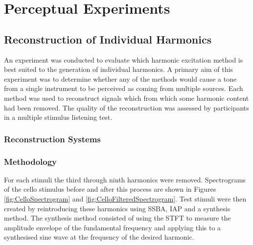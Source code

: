 \chapter{Perceptual Experiments}
\label{chap:PerceptualExperiments}

\section{Reconstruction of Individual Harmonics}
\label{sec:PerceptualExperiments-Reconstruction}
	An experiment was conducted to evaluate which harmonic excitation method is best suited to the generation of
	individual harmonics. A primary aim of this experiment was to determine whether any of the methods would cause a
	tone from a single instrument to be perceived as coming from multiple sources. Each method was used to reconstruct
	signals which from which some harmonic content had been removed. The quality of the reconstruction was assessed by
	participants in a multiple stimulus listening test. 

	\subsection{Reconstruction Systems}
	\label{sec:PerceptualExperiments-Reconstruction-Systems}

	\subsection{Methodology}
	\label{sec:PerceptualExperiments-Reconstruction-Methodology}

		For each stimuli the third through ninth harmonics were removed. Spectrograms of the cello stimulus before
		and after this process are shown in Figures \ref{fig:CelloSpectrogram} and
		\ref{fig:CelloFilteredSpectrogram}.  Test stimuli were then created by reintroducing these harmonics using
		SSBA, IAP and a synthesis method.  The synthesis method consisted of using the STFT to measure the amplitude
		envelope of the fundamental frequency and applying this to a synthesised sine wave at the frequency of the
		desired harmonic. 

